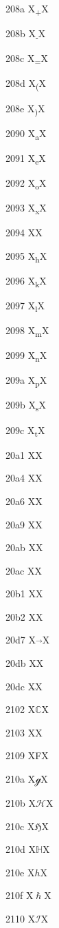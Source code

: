 \documentclass[11pt]{article}
\begin{document}
208a X{\textsubscript{+}}X

208b X{\textsubscript{-}}X

208c X{\textsubscript{=}}X

208d X{\textsubscript{(}}X

208e X{\textsubscript{)}}X

2090 X{\textsubscript{a}}X

2091 X{\textsubscript{e}}X

2092 X{\textsubscript{o}}X

2093 X{\textsubscript{x}}X

2094 X{\textsubscript{\textschwa}}X

2095 X{\textsubscript{h}}X

2096 X{\textsubscript{k}}X

2097 X{\textsubscript{l}}X

2098 X{\textsubscript{m}}X

2099 X{\textsubscript{n}}X

209a X{\textsubscript{p}}X

209b X{\textsubscript{s}}X

209c X{\textsubscript{t}}X

20a1 X{\textcolonmonetary}X

20a4 X{\textlira}X

20a6 X{\textnaira}X

20a9 X{\textwon}X

20ab X{\textdong}X

20ac X{\texteuro}X

20b1 X{\textpeso}X

20b2 X{\textguarani}X

20d7 X{\ensuremath{\vec{}}}X

20db X{\ensuremath{\dddot{}}}X

20dc X{\ensuremath{\ddddot{}}}X

2102 X{\ensuremath{\mathbb{C}}}X

2103 X{\textcelsius}X

2109 X{\textdegree{}F}X

210a X{\ensuremath{\mathscr{g}}}X

210b X{\ensuremath{\mathscr{H}}}X

210c X{\ensuremath{\mathfrak{H}}}X

210d X{\ensuremath{\mathbb{H}}}X

210e X{\ensuremath{h}}X

210f X{\ensuremath{\hslash}}X

2110 X{\ensuremath{\mathscr{I}}}X
\end{document}
